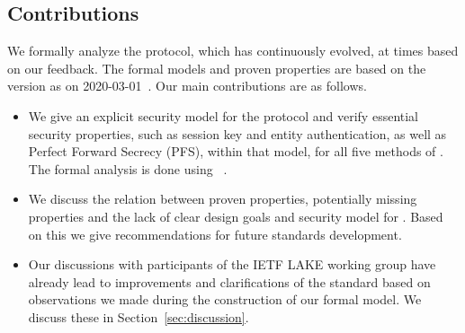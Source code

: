 \documentclass[runningheads, envcountsame, a4paper, draft, x11names]{llncs}
\newcommand{\spacehack}{\vspace{-1em}}
\newcommand{\fillhack}{\vspace{-0.5em}}
\begin{document}
\subsection{Contributions}
\label{sec:contributions}
\fillhack
We formally analyze the \mEdhoc{} protocol, which has continuously evolved,
at times based on our feedback.
%
The formal models and proven properties are based on the version as on 2020-03-01~\cite{selander-lake-edhoc-01}.
Our main contributions are as follows.
\begin{itemize}
    \item We give an explicit security model for the protocol and verify
        essential security properties, such as session key and entity
        authentication, as well as Perfect Forward Secrecy (PFS), within that
        model, for all five methods of \mEdhoc.
        The formal analysis is done using \mTamarin~\cite{DBLP:conf/cav/MeierSCB13}.
    \item We discuss the relation between proven properties, potentially missing
        properties and the lack of clear design goals and security model for
        \mEdhoc{}.
        Based on this we give recommendations for future standards development.
    \item Our discussions with participants of the IETF LAKE working group have
        already lead to improvements and clarifications of the standard
        based on observations we made during the construction of our
        formal model.  We discuss these in Section~\ref{sec:discussion}.
\end{itemize}

\spacehack
\end{document}
